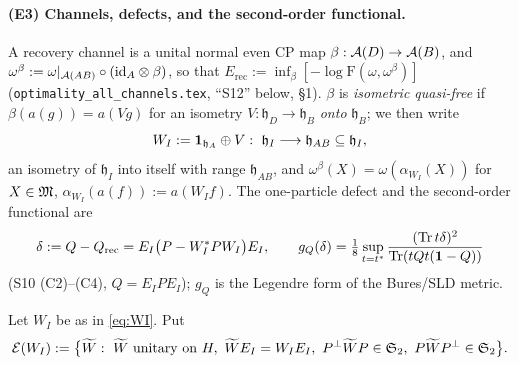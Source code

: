 \documentclass[11pt]{article}
\newcommand{\Wt}{\widetilde W}\newcommand{\kt}{\widetilde k}\newcommand{\Om}{\Omega}\newcommand{\Gm}{\Gamma}
\newcommand{\Stwo}{\mathfrak S_2}\newcommand{\Sone}{\mathfrak S_1}
\newcommand{\Erec}{E_{\mathrm{rec}}}\newcommand{\Gs}{\mathcal G}
\begin{document}
\paragraph{(E3) Channels, defects, and the second-order functional.}
A recovery channel is a unital normal even CP map $\beta:\mathcal A(D)\to\mathcal A(B)$, and
$\omega^\beta:=\omega|_{\mathcal A(AB)}\circ(\mathrm{id}_A\otimes\beta)$, so that
$\Erec:=\inf_\beta[-\log\mathrm F(\omega,\omega^\beta)]$ (\texttt{optimality\_all\_channels.tex},
``S12'' below, \S1).  $\beta$ is
\emph{isometric quasi-free} if $\beta(a(g))=a(Vg)$ for an isometry $V:\mathfrak h_D\to
\mathfrak h_B$ \emph{onto} $\mathfrak h_B$; we then write
\begin{equation}\label{eq:WI}
 W_I:=\mathbf 1_{\mathfrak h_A}\oplus V:\ \mathfrak h_I\longrightarrow\mathfrak h_{AB}\subseteq\mathfrak h_I ,
\end{equation}
an isometry of $\mathfrak h_I$ into itself with range $\mathfrak h_{AB}$, and
$\omega^\beta(X)=\omega(\alpha_{W_I}(X))$ for $X\in\mathfrak M$, $\alpha_{W_I}(a(f)):=a(W_If)$.
The one-particle defect and the second-order functional are
\begin{equation}\label{eq:defect}
 \delta:=Q-Q_{\rm rec}=E_I\bigl(P-W_I^*PW_I\bigr)E_I,\qquad
 g_Q(\delta)=\tfrac18\sup_{t=t^*}\frac{(\operatorname{Tr} t\delta)^2}{\operatorname{Tr}(tQt(\mathbf 1-Q))}
\end{equation}
(S10 (C2)--(C4), $Q=E_IPE_I$); $g_Q$ is the Legendre form of the Bures/SLD metric.

\begin{definition}\label{def:adm}
Let $W_I$ be as in \eqref{eq:WI}.  Put
\begin{equation}\label{eq:adm}
 \mathcal E(W_I):=\bigl\{\Wt:\ \Wt\ \text{unitary on }H,\ \Wt E_I=W_IE_I,\ \Pperp\Wt P\in\Stwo,\ P\Wt\Pperp\in\Stwo\bigr\}.
\end{equation}
\end{definition}
\end{document}
